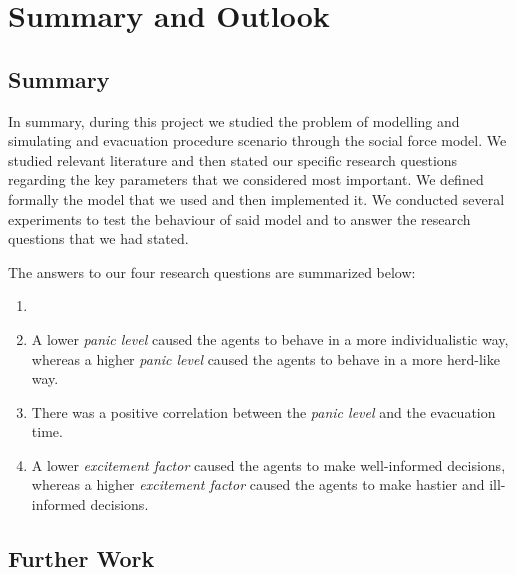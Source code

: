\section{Summary and Outlook} \label{sec:7-summary}
\subsection{Summary}
In summary, during this project we studied the problem of modelling and simulating and evacuation procedure scenario through the social force model. We studied relevant literature and then stated our specific research questions regarding the key parameters that we considered most important. We defined formally the model that we used and then implemented it. We conducted several experiments to test the behaviour of said model and to answer the research questions that we had stated.

The answers to our four research questions are summarized below:
\begin{enumerate}
	\item 
	
	\item A lower \emph{panic level} caused the agents to behave in a more individualistic way, whereas a higher \emph{panic level} caused the agents to behave in a more herd-like way.
	
	\item There was a positive correlation between the \emph{panic level} and the evacuation time.
	
	\item A lower \emph{excitement factor} caused the agents to make well-informed decisions, whereas a higher \emph{excitement factor} caused the agents to make hastier and ill-informed decisions.
\end{enumerate}

\subsection{Further Work}